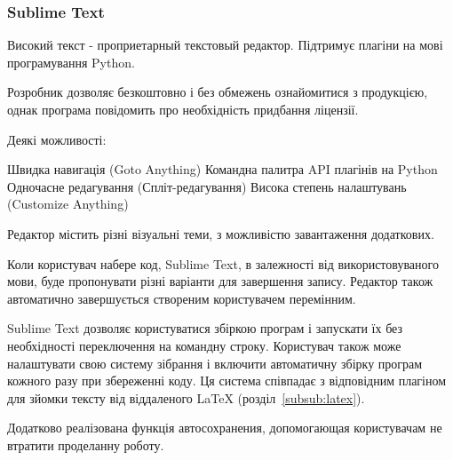 \subsubsection{Sublime Text}

Високий текст - проприетарный текстовый редактор. Підтримує плагіни на мові програмування Python.

Розробник дозволяє безкоштовно і без обмежень ознайомитися з продукцією, однак програма повідомить про необхідність придбання ліцензії.

Деякі можливості:

Швидка навигація (Goto Anything)
Командна палитра
API плагінів на Python
Одночасне редагування (Спліт-редагування)
Висока степень налаштувань (Customize Anything)

Редактор містить різні візуальні теми, з можливістю завантаження додаткових.

Коли користувач набере код, Sublime Text, в залежності від використовуваного мови, буде пропонувати різні варіанти для завершення запису. Редактор також автоматично завершується створеним користувачем перемінним.

Sublime Text дозволяє користуватися збіркою програм і запускати їх без необхідності переключення на командну строку. Користувач також може налаштувати свою систему зібрання і включити автоматичну збірку програм кожного разу при збереженні коду. Ця система співпадає з відповідним плагіном для зйомки тексту від віддаленого LaTeX (розділ~\ref{subsub:latex}).

Додатково реалізована функція автосохранения, допомогающая користувачам не втратити проделанну роботу.
